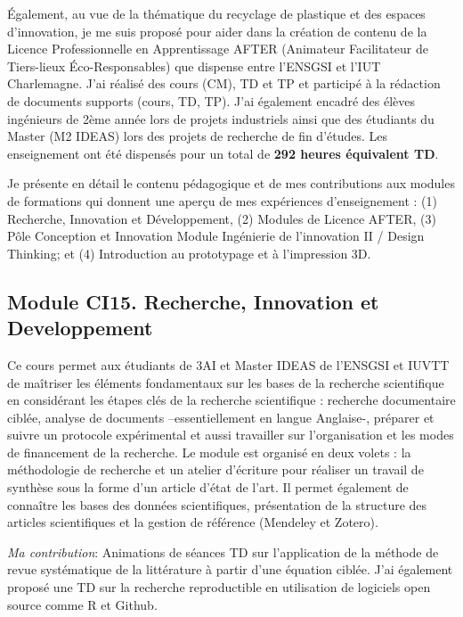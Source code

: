 \documentclass[
  11pt,
]{article}
\begin{document}
Également, au vue de la thématique du recyclage de plastique et des
espaces d'innovation, je me suis proposé pour aider dans la création de
contenu de la Licence Professionnelle en Apprentissage AFTER (Animateur
Facilitateur de Tiers-lieux Éco-Responsables) que dispense entre
l'ENSGSI et l'IUT Charlemagne. J'ai réalisé des cours (CM), TD et TP et
participé à la rédaction de documents supports (cours, TD, TP). J'ai
également encadré des élèves ingénieurs de 2ème année lors de projets
industriels ainsi que des étudiants du Master (M2 IDEAS) lors des
projets de recherche de fin d'études. Les enseignement ont été dispensés
pour un total de \textbf{292 heures équivalent TD}.

Je présente en détail le contenu pédagogique et de mes contributions aux
modules de formations qui donnent une aperçu de mes expériences
d'enseignement : (1) Recherche, Innovation et Développement, (2) Modules
de Licence AFTER, (3) Pôle Conception et Innovation Module Ingénierie de
l'innovation II / Design Thinking; et (4) Introduction au prototypage et
à l'impression 3D.

\hypertarget{module-ci15.-recherche-innovation-et-developpement}{%
\subsection{Module CI15. Recherche, Innovation et
Developpement}\label{module-ci15.-recherche-innovation-et-developpement}}

Ce cours permet aux étudiants de 3AI et Master IDEAS de l'ENSGSI et
IUVTT de maîtriser les éléments fondamentaux sur les bases de la
recherche scientifique en considérant les étapes clés de la recherche
scientifique : recherche documentaire ciblée, analyse de documents
--essentiellement en langue Anglaise-, préparer et suivre un protocole
expérimental et aussi travailler sur l'organisation et les modes de
financement de la recherche. Le module est organisé en deux volets : la
méthodologie de recherche et un atelier d'écriture pour réaliser un
travail de synthèse sous la forme d'un article d'état de l'art. Il
permet également de connaître les bases des données scientifiques,
présentation de la structure des articles scientifiques et la gestion de
référence (Mendeley et Zotero).

\emph{Ma contribution}: Animations de séances TD sur l'application de la
méthode de revue systématique de la littérature à partir d'une équation
ciblée. J'ai également proposé une TD sur la recherche reproductible en
utilisation de logiciels open source comme R et Github.
\end{document}
